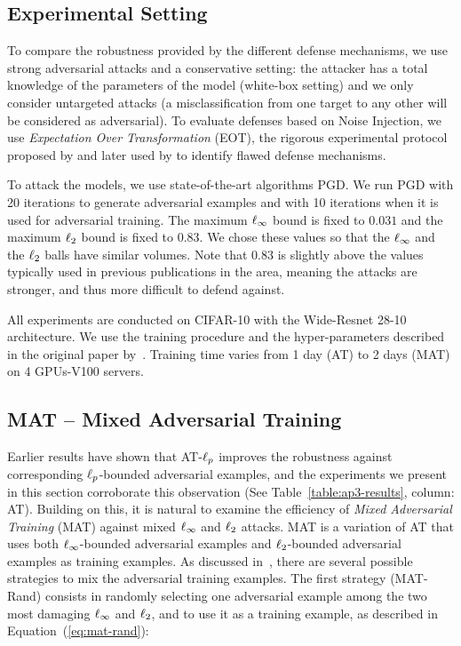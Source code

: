 \subsection{Experimental Setting}
\label{section:ap3-experimental_settings}

To compare the robustness provided by the different defense mechanisms, we use strong adversarial attacks and a conservative setting: the attacker has a total knowledge of the parameters of the model (white-box setting) and we only consider untargeted attacks  (a misclassification from one target to any other will be considered as adversarial).
To evaluate defenses based on Noise Injection, we use {\em Expectation Over Transformation} (EOT), the rigorous experimental protocol  proposed by \cite{athalye2017synthesizing} and later used by \cite{athalye2018obfuscated,carlini2019evaluating} to identify flawed defense mechanisms. 

To attack the models, we use state-of-the-art algorithms PGD.
We run PGD with 20 iterations to generate adversarial examples and with 10 iterations when it is used for adversarial training.
The maximum $\ell_\infty $ bound is fixed to $0.031$ and the maximum $\ell_2 $ bound is fixed to $0.83$.
We chose these values so that the $\ell_\infty $ and the $\ell_2 $ balls have similar volumes.
Note that $0.83$ is slightly above the values typically used in previous publications in the area, meaning the attacks are stronger, and thus  more difficult to defend against.

All experiments are conducted on CIFAR-10 with the Wide-Resnet 28-10 architecture.
We use the training procedure and the hyper-parameters described in the original paper by~\cite{ZagoruykoK16}.
Training time varies from 1 day (AT) to 2 days (MAT) on 4 GPUs-V100 servers. 


\subsection{MAT -- Mixed Adversarial Training}
\label{subsection:ap3-mixed_adversarial_training}

Earlier results have shown that AT-$\ell_p $ improves the robustness against corresponding $\ell_p $-bounded adversarial examples, and the experiments we present in this section corroborate this observation (See Table~\ref{table:ap3-results}, column: AT).
Building on this, it is natural to examine the efficiency of \emph{Mixed Adversarial Training} (MAT) against mixed $\ell_\infty $ and $\ell_2 $ attacks.
MAT is a variation of AT that uses both $\ell_\infty $-bounded adversarial examples and $\ell_2 $-bounded adversarial examples as training examples.
As discussed in~\cite{tramer2019adversarial}, there are several possible strategies to mix the adversarial training examples.
The first strategy (MAT-Rand) consists in randomly selecting one adversarial example among the two most damaging $\ell_\infty $ and $\ell_2 $, and to use it as a training example, as described in Equation~(\ref{eq:mat-rand}): 

